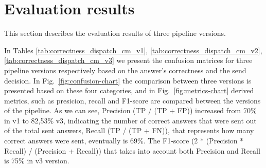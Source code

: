 \section{Evaluation results}
\label{sec:evaluation_results}

This section describes the evaluation results of three pipeline versions.

In Tables \ref{tab:correctness_dispatch_cm_v1}, \ref{tab:correctness_dispatch_cm_v2}, \ref{tab:correctness_dispatch_cm_v3} we present the confusion matrices for three pipeline versions respectively based on the answer's correctness and the send decision. In Fig.~\ref{fig:confusion-chart} the comparison between three versions is presented based on these four categories, and in Fig.~\ref{fig:metrics-chart} derived metrics, such as presicion, recall and F1-score are compared between the versions of the pipeline. As we can see, Precision (TP / (TP + FP)) increased from 70\% in v1 to 82,53\% v3, indicating the number of correct answers that were sent out of the total sent answers, Recall (TP / (TP + FN)), that represents how many correct answers were sent, eventually is 69\%. The F1-score (2 * (Precision * Recall) / (Precision + Recall)) that takes into account both Precision and Recall is 75\% in v3 version.

\makeatletter
\let\@currsize\normalsize
\makeatother

